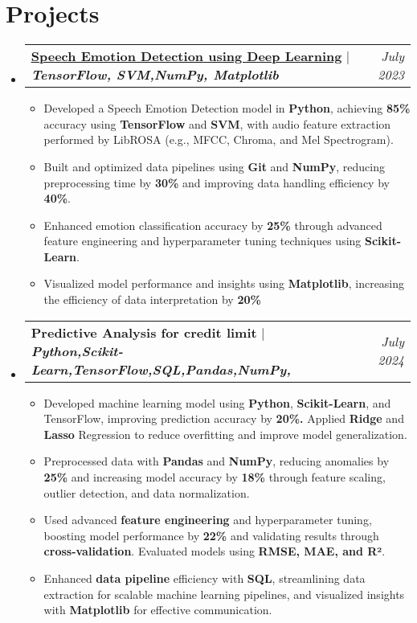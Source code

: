 \documentclass[letterpaper,11pt]{article}
\makeatletter
\newcommand{\resumeItem}[1]{
  \item\small{
    {#1 \vspace{-2pt}}
  }
}
\newcommand{\resumeProjectHeading}[2]{
    \item
    \begin{tabular*}{0.97\textwidth}{l@{\extracolsep{\fill}}r}
      \small#1 & #2 \\
    \end{tabular*}\vspace{-7pt}
}
\newcommand{\resumeSubHeadingListStart}{\begin{itemize}[leftmargin=0.15in, label={}]}
\newcommand{\resumeSubHeadingListEnd}{\end{itemize}}
\newcommand{\resumeItemListStart}{\begin{itemize}}
\newcommand{\resumeItemListEnd}{\end{itemize}\vspace{-5pt}}
\makeatother
\begin{document}


\section{Projects}
    \resumeSubHeadingListStart
      \resumeProjectHeading
          {\textbf{\underline{\href{https://github.com/MK-Github03/Speech-Emotion_recognition-using-Deep-learning}{Speech Emotion Detection using Deep Learning}}} $|$ \emph{\textbf{\scriptsize  TensorFlow, \scriptsize SVM,\scriptsize NumPy, \scriptsize Matplotlib}}}{\textit{July 2023}}
          \resumeItemListStart
          \vspace{0.5em} %
            \resumeItem{Developed a Speech Emotion Detection model in \textbf{Python}, achieving \textbf{85\%} accuracy using \textbf{TensorFlow} and \textbf{SVM}, with audio feature extraction performed by LibROSA (e.g., MFCC, Chroma, and Mel Spectrogram).}
            \resumeItem{Built and optimized data pipelines using \textbf{Git} and \textbf{NumPy}, reducing preprocessing time by \textbf{30\%} and improving data handling efficiency by \textbf{40\%}.}
            \resumeItem{Enhanced emotion classification accuracy by \textbf{25\%} through advanced feature engineering and hyperparameter tuning techniques using \textbf{Scikit-Learn}.}
            \resumeItem{Visualized model performance and insights using \textbf{Matplotlib}, increasing the efficiency of data interpretation by \textbf{20\%}}
          \resumeItemListEnd
      \resumeProjectHeading
          {\textbf{Predictive Analysis for credit limit} $|$ \emph{\textbf{\scriptsize Python,\scriptsize Scikit-Learn,\scriptsize TensorFlow,\scriptsize SQL,\scriptsize Pandas,\scriptsize NumPy,}}}{\textit{July 2024}}
          \resumeItemListStart
           \vspace{0.5em}
            \resumeItem{Developed machine learning model using \textbf{Python}, \textbf{Scikit-Learn}, and TensorFlow, improving prediction accuracy by \textbf{20\%.} Applied \textbf{Ridge} and \textbf{Lasso} Regression to reduce overfitting and improve model generalization.}
            \resumeItem{Preprocessed data with \textbf{Pandas} and \textbf{NumPy}, reducing anomalies by \textbf{25\%} and increasing model accuracy by \textbf{18\%} through feature scaling, outlier detection, and data normalization.}
            \resumeItem{Used advanced \textbf{feature engineering} and hyperparameter tuning, boosting model performance by \textbf{22\%} and validating results through \textbf{cross-validation}. Evaluated models using \textbf{RMSE, MAE, and R²}.}
            \resumeItem{Enhanced \textbf{data pipeline} efficiency with \textbf{SQL}, streamlining data extraction for scalable machine learning pipelines, and visualized insights with \textbf{Matplotlib} for effective communication.}
          \resumeItemListEnd
    \resumeSubHeadingListEnd




%


\end{document}
